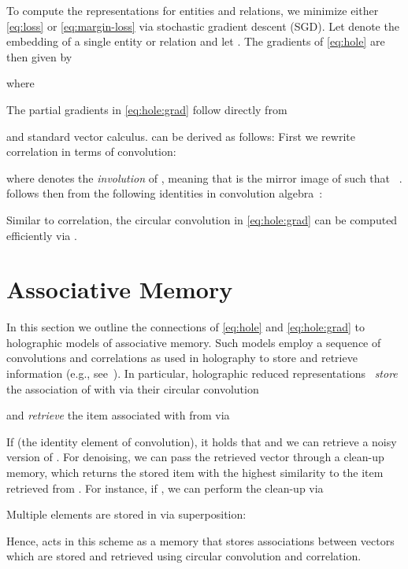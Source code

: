 \documentclass[letterpaper]{article}
\begin{document}
\noindent
To compute the representations for entities and relations, we minimize either
\cref{eq:loss} or \eqref{eq:margin-loss} via stochastic gradient descent (SGD).
Let  denote the embedding 
of a single entity or relation and let . 
The gradients of \cref{eq:hole} are then given by

where

The partial gradients in \cref{eq:hole:grad} follow directly from

and standard vector calculus. 
 can be derived as follows:
First we rewrite correlation in terms of convolution:

where  denotes the \emph{involution} of , meaning that
 is the mirror image of  such that ~\citep[eq. 2.4]{schonemann1987some}.
 follows then from the following identities in convolution algebra~\citep{plate1995holographic}:

Similar to correlation, the circular convolution in \cref{eq:hole:grad} can be
computed efficiently via .



\section{Associative Memory}
\label{sec:assoc-mem}

In this section we outline the connections of \cref{eq:hole} and
\cref{eq:hole:grad} to holographic models of associative memory. Such models
employ a sequence of convolutions and correlations as used in holography to
store and retrieve information (e.g.,
see~\cite{gabor1969associative,poggio1973holographic}).
In particular, holographic reduced representations~\citep{plate1995holographic}
\emph{store} the association of  with  via their circular convolution 

and \emph{retrieve} the item associated with  from  via

If  (the identity element of convolution),
it holds that  and we can retrieve a noisy version of . 
For denoising, we can pass the retrieved vector
through a clean-up memory, which returns the stored item with
the highest similarity to the item retrieved from
. For instance, if , we can perform the clean-up via

Multiple elements are stored in  via superposition:

Hence,  acts in this scheme as a memory that stores associations
between vectors which are stored and retrieved using circular convolution and
correlation.
\end{document}
